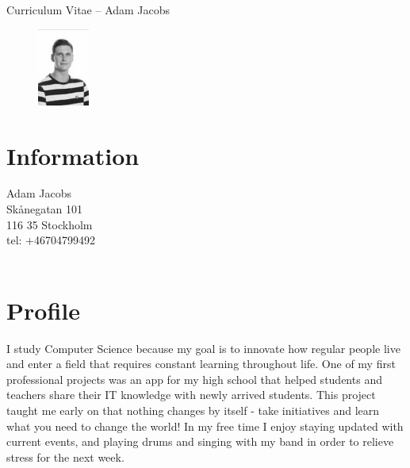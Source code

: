 \documentclass[margin,line,a4paper]{resume}
\begin{document}
{\sc \Large Curriculum Vitae -- Adam Jacobs}
\begin{resume}
    \vspace{0.01cm}
    \begin{figure}
        \vspace{-1cm}
       \begin{center}
       \includegraphics[width=0.15\textwidth]{adamjacobs}
       \end{center}
        \vspace{-1cm}
    \end{figure}
    
    \section{\mysidestyle Information}%
    Adam Jacobs \\
    Skånegatan 101  \\ 
    116 35 Stockholm \\ 
    tel: +46704799492 \\
    \href{} \\

\section{\mysidestyle Profile}\vspace{1mm}
    I study Computer Science because my goal is to innovate how regular people live and enter a field that requires constant learning throughout life. One of my first professional projects was an app for my high school that helped students and teachers share their IT knowledge with newly arrived students. This project taught me early on that nothing changes by itself - take initiatives and learn what you need to change the world! In my free time I enjoy staying updated with current events, and playing drums and singing with my band in order to relieve stress for the next week. 


\end{resume}
\end{document}
